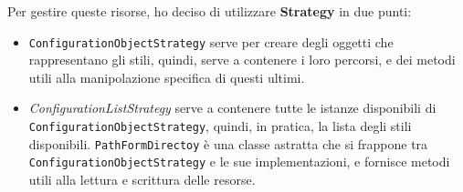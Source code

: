 \documentclass[a4paper,12pt]{report}
\begin{document}
Per gestire queste risorse, ho deciso di utilizzare \textbf{Strategy} in due punti:
\begin{itemize}
    \item  \texttt{ConfigurationObjectStrategy} serve per creare degli oggetti che rappresentano gli stili, quindi, serve a contenere i loro percorsi, e dei metodi utili alla manipolazione specifica di questi ultimi.
    \item \textit{ConfigurationListStrategy} serve a contenere tutte le istanze disponibili di \texttt{ConfigurationObjectStrategy}, quindi, in pratica, la lista degli stili disponibili.
    \texttt{PathFormDirectoy} è una classe astratta che si frappone tra \texttt{ConfigurationObjectStrategy} e le sue implementazioni, e fornisce metodi utili alla lettura e scrittura delle resorse.
\end{itemize}
\paragraph{}
\end{document}
